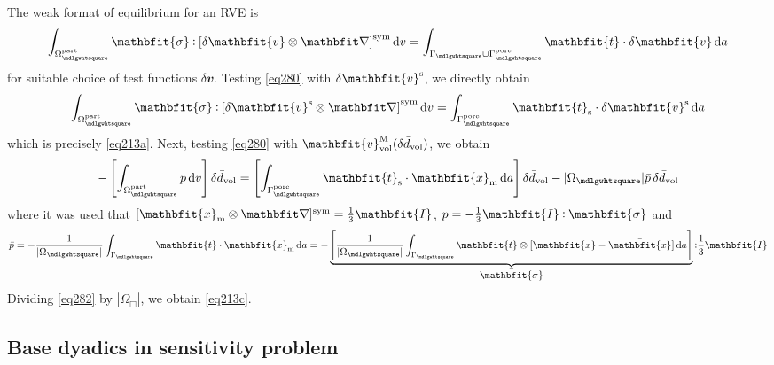 \documentclass[12pt,a4paper,fleqn]{article}
\renewcommand{\ta}[1]{\mathbfit{#1}}
\renewcommand{\ts}[1]{\mathbfit{#1}}
\renewcommand{\Box}{\mdlgwhtsquare}
\newcommand{\pore}{\mathrm{pore}}
\newcommand{\particle}{\mathrm{part}}
\newcommand{\surf}{\mathrm{s}}
\begin{document}
The weak format of equilibrium for an RVE is
\begin{equation}
    \int_{\Omega^\particle_\Box} \ts{\sigma} \dprod \left[\delta \ta{v}\outerp\diff\right]^\sym \dif v =
    \int_{\Gamma_\Box\cup\Gamma_\Box^\pore} \ta{t} \cdot \delta\ta{v} \dif a
\label{eq280}
\end{equation}
for suitable choice of test functions $\delta \ta{v}$. Testing \eqref{eq280} with $\delta \ta{v}^\fluct$, we directly obtain
\begin{equation}
    \int_{\Omega^\particle_\Box} \ts{\sigma} \dprod \left[\delta \ta{v}^\fluct\outerp\diff\right]^\sym \dif v =
    \int_{\Gamma_\Box^\pore} \ta{t}_\surf \cdot \delta\ta{v}^\fluct \dif a
\label{eq281}
\end{equation}
which is precisely \eqref{eq213a}. Next, testing \eqref{eq280} with $\ta{v}^\macro_\vol(\delta\bar{d}_\vol)$, we obtain
\begin{equation}
    - \left[\int_{\Omega^\particle_\Box} p  \dif v \right]\delta\bar{d}_\vol =
    \left[\int_{\Gamma_\Box^\pore} \ta{t}_\surf \cdot \ta{x}_\mean \dif a\right]\delta\bar{d}_\vol
    - |\Omega_\Box|\bar{p}\,\delta\bar{d}_\vol
\label{eq282}
\end{equation}
where it was used that $[\ta{x}_\mean\outerp\diff]^\sym=\frac{1}{3}\ts{I}$, $p=-\frac{1}{3}\ts{I}\dprod\ts{\sigma}$ and
\begin{equation}
    \bar{p} = - \frac{1}{|\Omega_\Box|} \int_{\Gamma_\Box} \ta{t} \cdot \ta{x}_\mean \dif a =
     - \underbrace{\left[\frac{1}{|\Omega_\Box|} \int_{\Gamma_\Box} \ta{t} \outerp [\ta{x}-\bar{\ta{x}}] \dif a\right]}_{\displaystyle\bar{\ts\sigma}}  \dprod \frac{1}{3}\ts{I}
\end{equation}
Dividing \eqref{eq282} by $|\Omega_\Box|$, we obtain \eqref{eq213c}.

\subsection{Base dyadics in sensitivity problem}
\end{document}

